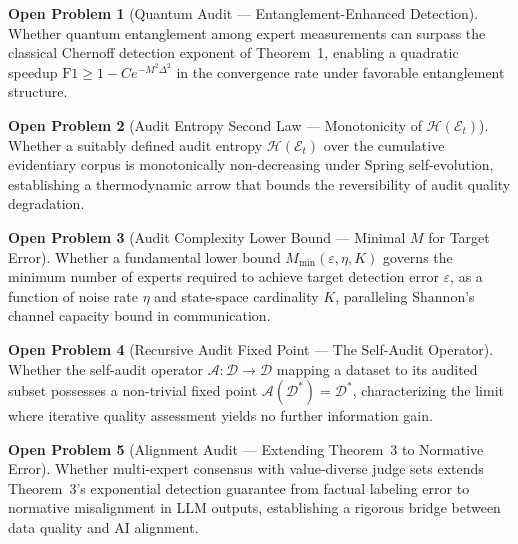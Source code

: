 \documentclass[twocolumn]{article}
\theoremstyle{definition}
\newtheorem{openproblem}{Open Problem}
\begin{document}
\begin{openproblem}[Quantum Audit — Entanglement-Enhanced Detection]
\label{prob:quantum}
Whether quantum entanglement among expert measurements can surpass the classical Chernoff detection exponent of Theorem~1, enabling a quadratic speedup $\mathrm{F1} \geq 1 - C e^{-M^2\Delta^2}$ in the convergence rate under favorable entanglement structure.
\end{openproblem}

\begin{openproblem}[Audit Entropy Second Law — Monotonicity of $\mathcal{H}(\mathcal{E}_t)$]
\label{prob:entropy}
Whether a suitably defined audit entropy $\mathcal{H}(\mathcal{E}_t)$ over the cumulative evidentiary corpus is monotonically non-decreasing under Spring self-evolution, establishing a thermodynamic arrow that bounds the reversibility of audit quality degradation.
\end{openproblem}

\begin{openproblem}[Audit Complexity Lower Bound — Minimal $M$ for Target Error]
\label{prob:complexity}
Whether a fundamental lower bound $M_{\min}(\varepsilon, \eta, K)$ governs the minimum number of experts required to achieve target detection error $\varepsilon$, as a function of noise rate $\eta$ and state-space cardinality $K$, paralleling Shannon's channel capacity bound in communication.
\end{openproblem}

\begin{openproblem}[Recursive Audit Fixed Point — The Self-Audit Operator]
\label{prob:recursive}
Whether the self-audit operator $\mathcal{A}: \mathcal{D} \to \mathcal{D}$ mapping a dataset to its audited subset possesses a non-trivial fixed point $\mathcal{A}(\mathcal{D}^*) = \mathcal{D}^*$, characterizing the limit where iterative quality assessment yields no further information gain.
\end{openproblem}

\begin{openproblem}[Alignment Audit — Extending Theorem~3 to Normative Error]
\label{prob:alignment}
Whether multi-expert consensus with value-diverse judge sets extends Theorem~3's exponential detection guarantee from factual labeling error to normative misalignment in LLM outputs, establishing a rigorous bridge between data quality and AI alignment.
\end{openproblem}
\end{document}
